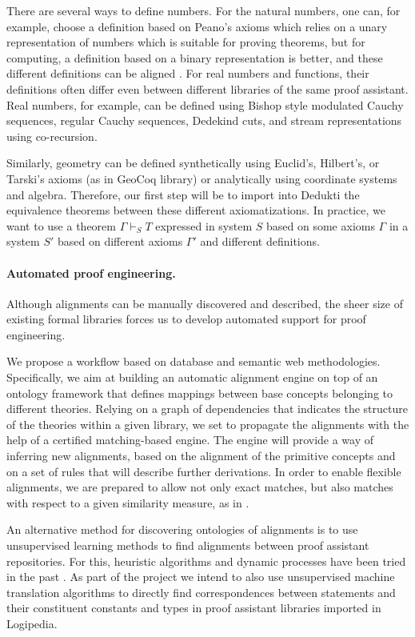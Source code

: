 There are several ways to define numbers. For the natural numbers, one
can, for example, choose a definition based on Peano's axioms which
relies on a unary representation of numbers which is suitable for
proving theorems, but for computing, a definition based on a binary
representation is better, and these different definitions can be
aligned \cite{magaud03DataRepresentation}. For real numbers and
functions, their definitions often differ even between different
libraries of the same proof assistant.  Real numbers, for example, can
be defined using Bishop style modulated Cauchy sequences, regular
Cauchy sequences, Dedekind cuts, and stream representations using
co-recursion.

Similarly, geometry can be defined synthetically using Euclid's,
Hilbert's, or Tarski's axioms (as in GeoCoq library) or analytically
using coordinate systems and algebra. Therefore, our first step will
be to import into Dedukti the equivalence theorems between these
different axiomatizations. In practice, we want to use a theorem
$\Gamma \vdash_S T$ expressed in system $S$ based on some axioms
$\Gamma$ in a system $S'$ based on different axioms $\Gamma'$ and
different definitions.

\paragraph*{Automated proof engineering.}
Although alignments can be manually discovered and described, the
sheer size of existing formal libraries forces us to develop automated
support for proof engineering.

We propose a workflow based on database and semantic web
methodologies. Specifically, we aim at building an automatic alignment
engine on top of an ontology framework that defines mappings between
base concepts belonging to different theories. Relying on a graph of
dependencies that indicates the structure of the theories within a
given library, we set to propagate the alignments with the help of a
certified matching-based engine. The engine will provide a way of
inferring new alignments, based on the alignment of the primitive
concepts and on a set of rules that will describe further
derivations. In order to enable flexible alignments, we are prepared
to allow not only exact matches, but also matches with respect to a
given similarity measure, as in \cite{GAUTHIER201989}.

An alternative method for discovering ontologies of alignments is to
use unsupervised learning methods to find alignments between proof
assistant repositories. For this, heuristic algorithms and dynamic
processes have been tried in the past \cite{GAUTHIER201989}.  As part
of the project we intend to also use unsupervised machine translation
algorithms \cite{DBLP:journals/corr/abs-1804-07755} to directly find
correspondences between statements and their constituent constants and
types in proof assistant libraries imported in Logipedia.

